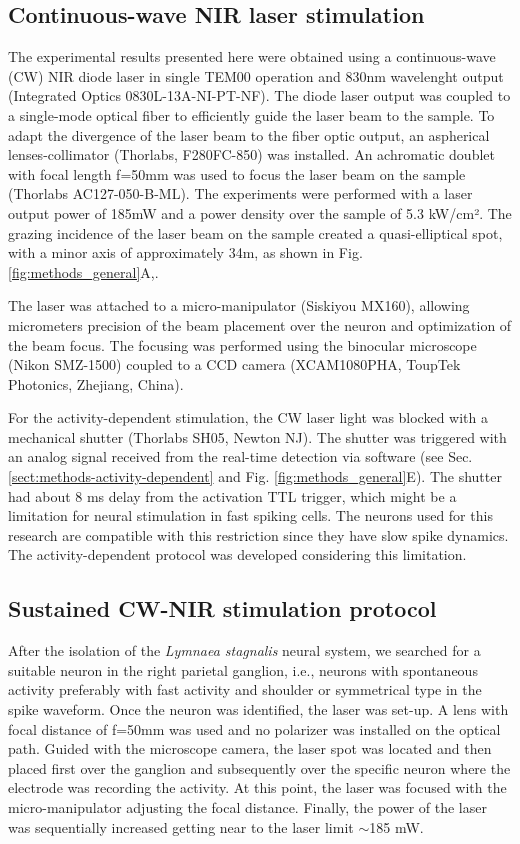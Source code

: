 \subsection{Continuous-wave NIR laser stimulation}
The experimental results presented here were obtained using a continuous-wave (CW) NIR diode laser in single TEM00 operation and 830nm wavelenght output (Integrated Optics 0830L-13A-NI-PT-NF). 
The diode laser output was coupled to a single-mode optical fiber to efficiently guide the laser beam to the sample. To adapt the divergence of the laser beam to the fiber optic output, an aspherical lenses-collimator (Thorlabs, F280FC-850) was installed. An achromatic doublet with focal length f=50mm was used to focus the laser beam on the sample (Thorlabs AC127-050-B-ML). The experiments were performed with a laser output power of 185mW and a power density over the sample of 5.3 kW/cm². The grazing incidence of the laser beam on the sample created a quasi-elliptical spot, with a minor axis of approximately 34{\textmu}m, as shown in Fig. \ref{fig:methods_general}A,.

The laser was attached to a micro-manipulator (Siskiyou MX160), allowing micrometers precision of the beam placement over the neuron and optimization of the beam focus. The focusing was performed using the binocular microscope (Nikon SMZ-1500) coupled to a CCD camera (XCAM1080PHA, ToupTek Photonics, Zhejiang, China).

For the activity-dependent stimulation, the CW laser light was blocked with a mechanical shutter (Thorlabs SH05, Newton NJ). The shutter was triggered with an analog signal received from the real-time detection via software (see Sec. \ref{sect:methods-activity-dependent} and Fig. \ref{fig:methods_general}E). The shutter had about 8 ms delay from the activation TTL trigger, which might be a limitation for neural stimulation in fast spiking cells. The neurons used for this research are compatible with this restriction since they have slow spike dynamics. The activity-dependent protocol was developed considering this limitation. 

\subsection{Sustained CW-NIR stimulation protocol}
\label{sect:sustained-protocol}
After the isolation of the \textit{Lymnaea stagnalis} neural system, we searched for a suitable neuron in the right parietal ganglion, i.e., neurons with spontaneous activity preferably with fast activity and shoulder or symmetrical type in the spike waveform. 
Once the neuron was identified, the laser was set-up. A lens with focal distance of f=50mm was used and no polarizer was installed on the optical path. Guided with the microscope camera, the laser spot was located and then placed first over the ganglion and subsequently over the specific neuron where the electrode was recording the activity. 
At this point, the laser was focused with the micro-manipulator adjusting the focal distance. Finally, the power of the laser was sequentially increased getting near to the laser limit $\sim$185 mW.

